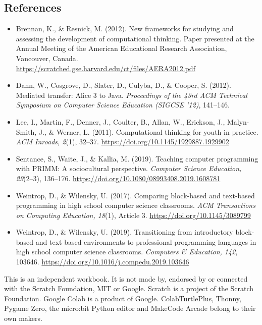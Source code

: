 \subsection*{References}

{\footnotesize
\begin{itemize}[leftmargin=*, itemsep=1pt]
  \item Brennan, K., \& Resnick, M. (2012). New frameworks for studying and assessing the development of computational thinking. Paper presented at the Annual Meeting of the American Educational Research Association, Vancouver, Canada. \url{https://scratched.gse.harvard.edu/ct/files/AERA2012.pdf}
  \item Dann, W., Cosgrove, D., Slater, D., Culyba, D., \& Cooper, S. (2012). Mediated transfer: Alice 3 to Java. \emph{Proceedings of the 43rd ACM Technical Symposium on Computer Science Education (SIGCSE '12)}, 141--146.
  \item Lee, I., Martin, F., Denner, J., Coulter, B., Allan, W., Erickson, J., Malyn-Smith, J., \& Werner, L. (2011). Computational thinking for youth in practice. \emph{ACM Inroads, 2}(1), 32--37. \url{https://doi.org/10.1145/1929887.1929902}
  \item Sentance, S., Waite, J., \& Kallia, M. (2019). Teaching computer programming with PRIMM: A sociocultural perspective. \emph{Computer Science Education, 29}(2--3), 136--176. \url{https://doi.org/10.1080/08993408.2019.1608781}
  \item Weintrop, D., \& Wilensky, U. (2017). Comparing block-based and text-based programming in high school computer science classrooms. \emph{ACM Transactions on Computing Education, 18}(1), Article 3. \url{https://doi.org/10.1145/3089799}
  \item Weintrop, D., \& Wilensky, U. (2019). Transitioning from introductory block-based and text-based environments to professional programming languages in high school computer science classrooms. \emph{Computers \& Education, 142}, 103646. \url{https://doi.org/10.1016/j.compedu.2019.103646}
\end{itemize}
}

\vspace{10pt}
\begin{tcolorbox}[colback=white, colframe=muted!50, boxrule=0.5pt, arc=5pt]
{\small\color{muted}This is an independent workbook. It is not made by, endorsed by or connected with the Scratch Foundation, MIT or Google. Scratch is a project of the Scratch Foundation. Google Colab is a product of Google. ColabTurtlePlus, Thonny, Pygame Zero, the micro:bit Python editor and MakeCode Arcade belong to their own makers.}
\end{tcolorbox}
